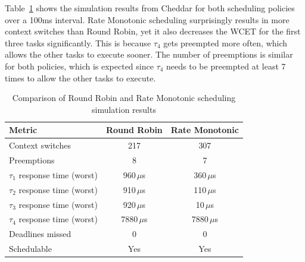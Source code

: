 Table~\ref{tab:scheduling-comparison} shows the simulation results from Cheddar for both scheduling policies over a 100ms interval.
Rate Monotonic scheduling surprisingly results in more context switches than Round Robin, yet it also decreases the WCET for the first three tasks significantly. This is because $\tau_4$ gets preempted more often, which allows the other tasks to execute sooner. The number of preemptions is similar for both policies, which is expected since $\tau_4$ needs to be preempted at least 7 times to allow the other tasks to execute.

\begin{table}[htbp]
    \centering
    \caption{Comparison of Round Robin and Rate Monotonic scheduling simulation results}
    \label{tab:scheduling-comparison}
    \begin{tabular}{|l|c|c|}
        \hline
        \textbf{Metric} & \textbf{Round Robin} & \textbf{Rate Monotonic} \\
        \hline
        Context switches & 217 & 307 \\
        \hline
        Preemptions & 8 & 7 \\
        \hline
        $\tau_1$ response time (worst) & 960\,$\mu$s & 360\,$\mu$s \\
        \hline
        $\tau_2$ response time (worst) & 910\,$\mu$s & 110\,$\mu$s \\
        \hline
        $\tau_3$ response time (worst) & 920\,$\mu$s & 10\,$\mu$s \\
        \hline
        $\tau_4$ response time (worst) & 7880\,$\mu$s & 7880\,$\mu$s \\
        \hline
        Deadlines missed & 0 & 0 \\
        \hline
        Schedulable & Yes & Yes \\
        \hline
    \end{tabular}
\end{table}

